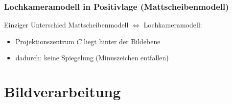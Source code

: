 \subsubsection*{Lochkameramodell in Positivlage (Mattscheibenmodell)}

Einziger Unterschied Mattscheibenmodell $\Leftrightarrow$ Lochkameramodell:
\begin{itemize}
\item Projektionszentrum $C$ liegt hinter der Bildebene
\item dadurch: keine Spiegelung (Minuszeichen entfallen)
\end{itemize}

%

\section{Bildverarbeitung}


